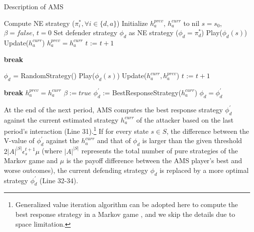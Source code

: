 \begin{algorithm}[t]\small
\caption{Description of AMS}
\label{AMS}
\begin{algorithmic}[1]
\STATE Compute NE strategy ($\pi^*_i, \forall i\in\{d,a\}$)
\REPEAT 
\STATE Initialize $h_a^{prev}$, $h_a^{curr}$ to nil
\STATE $s = s_0$, $\beta = false$, $t = 0$
\STATE Set defender strategy $\phi_d$ as NE strategy ($\phi_d = \pi_d^*$)
\STATE Play($\phi_d(s)$)
\STATE Update($h_a^{curr}$)
\ENDFOR
\STATE $h_a^{prev} = h_a^{curr}$
\STATE $t$ := $t + 1$

     \STATE  \textbf{break}
      \ENDIF
\ENDWHILE

\STATE $\phi_d$ = RandomStrategy()
\STATE Play($\phi_d(s)$)
\STATE Update($h_a^{curr}, h_a^{prev}$)
\ENDFOR
\STATE $t$ := $t + 1$

        \STATE \textbf{break}
      \ENDIF
  \ENDIF
  \STATE $h_a^{prev} = h_a^{curr}$
   \STATE $\beta := true$
   \STATE $\phi_d^\prime$ := BestResponseStrategy($h_a^{curr}$)
       \STATE $\phi_d = \phi_d^\prime$
   \ENDIF
\ENDWHILE
\UNTIL{}
\end{algorithmic}
\end{algorithm}

At the end of the next period, AMS computes the best response strategy $\phi_d^\prime$  against the current estimated strategy $h_a^{curr}$ of the attacker based on the last period's interaction (Line 31).\footnote{Generalized value iteration algorithm can be adopted here to compute the best response strategy in a Markov game \cite{sigaud2013markov}, and we skip the details due to space limitation.} If for every state $s\in S$, the difference between the V-value of $\phi_d^\prime$ against the $h_a^{curr}$ and that of $\phi_d$ is larger than the given threshold $2|A|^{|S|}\epsilon^{t+1}_s\mu$ (where $|A|^{|S|}$ represents the total number of pure strategies of the Markov game and $\mu$ is the payoff difference between the AMS player's best and worse outcomes), the current defending strategy $\phi_d$ is replaced by a more optimal strategy $\phi_d^\prime$ (Line 32-34).


